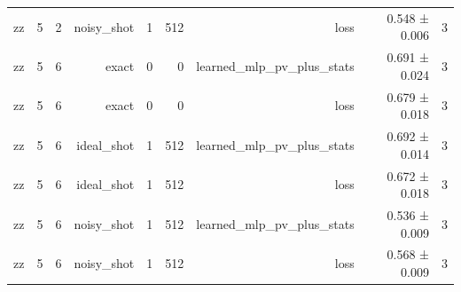 \begin{table}
\begin{tabular}{lrrrrrrrr}
zz & 5 & 2 & noisy\_shot & 1 & 512 & loss & 0.548 ± 0.006 & 3 \\
zz & 5 & 6 & exact & 0 & 0 & learned\_mlp\_pv\_plus\_stats & 0.691 ± 0.024 & 3 \\
zz & 5 & 6 & exact & 0 & 0 & loss & 0.679 ± 0.018 & 3 \\
zz & 5 & 6 & ideal\_shot & 1 & 512 & learned\_mlp\_pv\_plus\_stats & 0.692 ± 0.014 & 3 \\
zz & 5 & 6 & ideal\_shot & 1 & 512 & loss & 0.672 ± 0.018 & 3 \\
zz & 5 & 6 & noisy\_shot & 1 & 512 & learned\_mlp\_pv\_plus\_stats & 0.536 ± 0.009 & 3 \\
zz & 5 & 6 & noisy\_shot & 1 & 512 & loss & 0.568 ± 0.009 & 3 \\
\bottomrule
\end{tabular}
\end{table}


